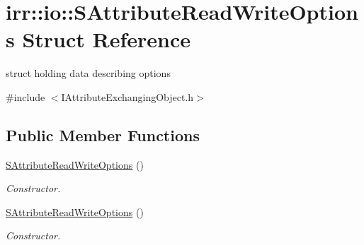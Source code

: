 \hypertarget{structirr_1_1io_1_1SAttributeReadWriteOptions}{}\section{irr\+:\+:io\+:\+:S\+Attribute\+Read\+Write\+Options Struct Reference}
\label{structirr_1_1io_1_1SAttributeReadWriteOptions}


struct holding data describing options  




{\ttfamily \#include $<$I\+Attribute\+Exchanging\+Object.\+h$>$}

\subsection*{Public Member Functions}
\begin{DoxyCompactItemize}
\item 
\mbox{\label{structirr_1_1io_1_1SAttributeReadWriteOptions_a8e25421df9794a7f138f816beee76575}} 
\hyperlink{structirr_1_1io_1_1SAttributeReadWriteOptions_a8e25421df9794a7f138f816beee76575}{S\+Attribute\+Read\+Write\+Options} ()
\begin{DoxyCompactList}\small\item\em Constructor. \end{DoxyCompactList}\item 
\mbox{\label{structirr_1_1io_1_1SAttributeReadWriteOptions_a8e25421df9794a7f138f816beee76575}} 
\hyperlink{structirr_1_1io_1_1SAttributeReadWriteOptions_a8e25421df9794a7f138f816beee76575}{S\+Attribute\+Read\+Write\+Options} ()
\begin{DoxyCompactList}\small\item\em Constructor. \end{DoxyCompactList}\end{DoxyCompactItemize}
